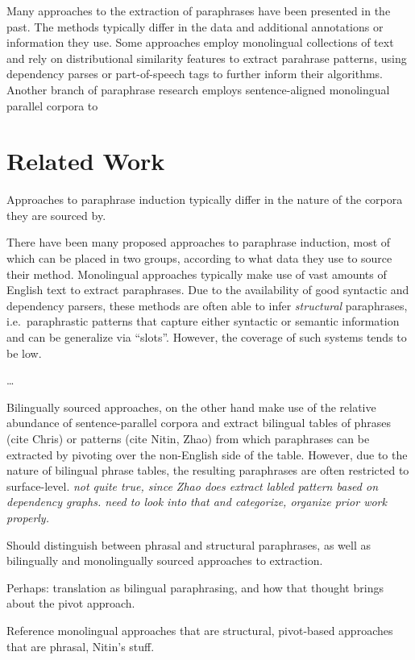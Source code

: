 \documentclass[11pt]{article}
\begin{document}
Many approaches to the extraction of paraphrases have been presented
in the past. The methods typically differ in the data and additional
annotations or information they use. Some approaches employ
monolingual collections of text and rely on distributional similarity
features to extract parahrase patterns, using dependency parses
\cite{Lin2001} or part-of-speech tags \cite{Bhagat2008} to further
inform their algorithms. Another branch of paraphrase research employs
sentence-aligned monolingual parallel corpora 
\cite{Barzilay2001,Quirk2004} to 

\section{Related Work} \label{related_work}

Approaches to paraphrase induction typically differ in the nature of
the corpora they are sourced by.

There have been many proposed approaches to paraphrase induction, most
of which can be placed in two groups, according to what data they use
to source their method. Monolingual approaches typically make use of
vast amounts of English text to extract paraphrases. Due to the
availability of good syntactic and dependency parsers, these methods
are often able to infer \emph{structural} paraphrases, i.e.\
paraphrastic patterns that capture either syntactic or semantic
information and can be generalize via ``slots''. However, the coverage
of such systems tends to be low.

\ldots

Bilingually sourced approaches, on the other hand make use of the
relative abundance of sentence-parallel corpora and extract bilingual
tables of phrases (cite Chris) or patterns (cite Nitin, Zhao) from
which paraphrases can be extracted by pivoting over the non-English
side of the table. However, due to the nature of bilingual phrase
tables, the resulting paraphrases are often restricted to
surface-level.
\emph{not quite true, since Zhao does extract labled pattern based on
  dependency graphs. need to look into that and categorize, organize
  prior work properly.}


Should distinguish between phrasal and structural paraphrases, as well
as bilingually and monolingually sourced approaches to extraction.

Perhaps: translation as bilingual paraphrasing, and how that thought
brings about the pivot approach.

Reference monolingual approaches that are structural, pivot-based
approaches that are phrasal, Nitin's stuff.
\end{document}
